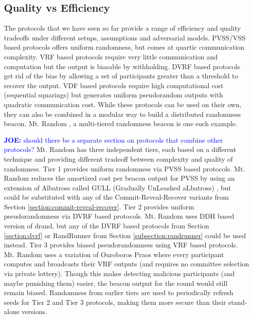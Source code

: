 \documentclass[letterpaper,twocolumn,10pt]{article}
\theoremstyle{definition}
\theoremstyle{remark}
\newcommand{\joenote}[1]{\textcolor{blue}{\textbf{JOE:} #1}}
\begin{document}
\iffalse
\subsection{Quality vs Efficiency}
The protocols that we have seen so far provide a range of efficiency and quality tradeoffs under different setups, assumptions and adversarial models. PVSS/VSS based protocols offers uniform randomness, but comes at quartic communication complexity. 
VRF based protocols require very little communication and computation but the output is biasable by withholding. DVRF based protocols get rid of the bias by allowing a set of participants greater than a threshold to recover the output. VDF based protocols require high computational cost (sequential squarings) but generates uniform pseudorandom outputs with quadratic communication cost. While these protocols can be used on their own, they can also be combined in a modular way to build a distributed randomness beacon. Mt. Random \cite{cascudomt}, a multi-tiered randomness beacon is one such example.

\joenote{should there be a separate section on protocols that combine other protocols?}
Mt. Random has three independent tiers, each based on a different technique and providing different tradeoff between complexity and quality of randomness. Tier 1 provides uniform randomness via PVSS based protocols. Mt. Random reduces the amortized cost per beacon output for PVSS by using an extension of Albatross called GULL (Gradually UnLeashed aLbatross) \cite{cascudomt}, but could be substituted with any of the Commit-Reveal-Recover variants from Section \ref{section:commit-reveal-recover}. Tier 2 provides uniform pseudorandomness via DVRF based protocols. Mt. Random uses DDH based version of drand, but any of the DVRF based protocols from Section \ref{section:dvrf} or RandRunner from Section \ref{subsection:randrunner} could be used instead. Tier 3 provides biased pseudorandomness using VRF based protocols. Mt. Random uses a variation of Ouroboros Praos where every participant computes and broadcasts their VRF outputs (and requires no committee selection via private lottery). Though this makes detecting malicious participants (and maybe punishing them) easier, the beacon output for the round would still remain biased. Randomness from earlier tiers are used to periodically refresh seeds for Tier 2 and Tier 3 protocols, making them more secure than their stand-alone versions.
\end{document}
